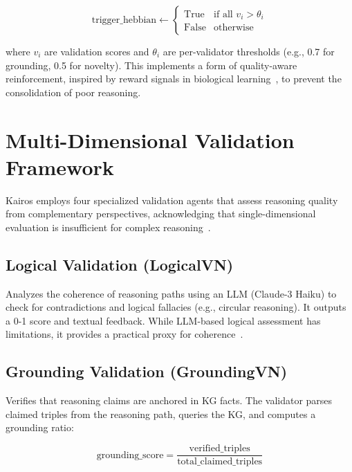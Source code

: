 \documentclass{article}
\begin{document}
\begin{equation}
\text{trigger\_hebbian} \leftarrow \begin{cases}
\text{True} & \text{if all } v_i > \theta_i \\
\text{False} & \text{otherwise}
\end{cases}
\end{equation}

where $v_i$ are validation scores and $\theta_i$ are per-validator thresholds (e.g., 0.7 for grounding, 0.5 for novelty). This implements a form of quality-aware reinforcement, inspired by reward signals in biological learning~\citep{squire2015memory}, to prevent the consolidation of poor reasoning.

\section{Multi-Dimensional Validation Framework}
\label{sec:validation}

Kairos employs four specialized validation agents that assess reasoning quality from complementary perspectives, acknowledging that single-dimensional evaluation is insufficient for complex reasoning~\citep{park2023generative,xu2025amem}.

\subsection{Logical Validation (LogicalVN)}

Analyzes the coherence of reasoning paths using an LLM (Claude-3 Haiku) to check for contradictions and logical fallacies (e.g., circular reasoning). It outputs a 0-1 score and textual feedback. While LLM-based logical assessment has limitations, it provides a practical proxy for coherence~\citep{pan2024unifying}.

\subsection{Grounding Validation (GroundingVN)}

Verifies that reasoning claims are anchored in KG facts. The validator parses claimed triples from the reasoning path, queries the KG, and computes a grounding ratio:

\begin{equation}
\text{grounding\_score} = \frac{\text{verified\_triples}}{\text{total\_claimed\_triples}}
\end{equation}
\end{document}
